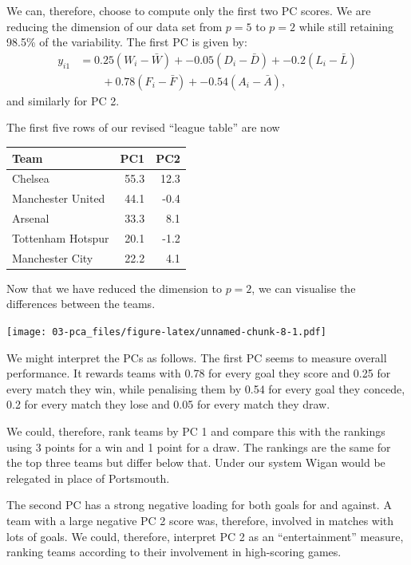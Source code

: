 \documentclass[]{book}
\theoremstyle{definition}
\theoremstyle{definition}
\theoremstyle{definition}
\theoremstyle{remark}
\begin{document}
We can, therefore, choose to compute only the first two PC scores. We are reducing the dimension of our data set from \(p=5\) to \(p=2\) while still retaining 98.5\% of the variability. The first PC is given by:
\begin{align*}
y_{i1} &= 0.25(W_i-\bar{W}) +-0.05(D_i-\bar{D}) +-0.2(L_i-\bar{L})\\
& \qquad +0.78(F_i-\bar{F}) +-0.54(A_i-\bar{A}),
\end{align*}
and similarly for PC 2.

The first five rows of our revised ``league table'' are now

\begin{table}[H]
\centering
\begin{tabular}{lrr}
\toprule
Team & PC1 & PC2\\
\midrule
Chelsea & 55.3 & 12.3\\
Manchester United & 44.1 & -0.4\\
Arsenal & 33.3 & 8.1\\
Tottenham Hotspur & 20.1 & -1.2\\
Manchester City & 22.2 & 4.1\\
\bottomrule
\end{tabular}
\end{table}

Now that we have reduced the dimension to \(p=2\), we can visualise the differences between the teams.

\texttt{[image: 03-pca\_files/figure-latex/unnamed-chunk-8-1.pdf]}

We might interpret the PCs as follows. The first PC seems to measure overall performance. It rewards teams with 0.78 for every goal they score and 0.25 for every match they win, while penalising them by 0.54 for every goal they concede, 0.2 for every match they lose and 0.05 for every match they draw.

We could, therefore, rank teams by PC 1 and compare this with the rankings using 3 points for a win and 1 point for a draw. The rankings are the same for the top three teams but differ below that. Under our system Wigan would be relegated in place of Portsmouth.

The second PC has a strong negative loading for both goals for and against. A team with a large negative PC 2 score was, therefore, involved in matches with lots of goals. We could, therefore, interpret PC 2 as an ``entertainment'' measure, ranking teams according to their involvement in high-scoring games.
\end{document}
